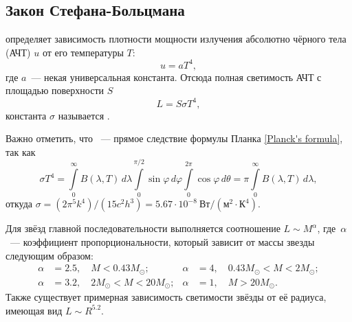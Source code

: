 \subsection{Закон Стефана-Больцмана}
 определяет зависимость плотности мощности излучения абсолютно чёрного тела (АЧТ) $u$ от его температуры $T$:
\begin{equation}
u = a T^4,
\end{equation} 
где $a$~--- некая универсальная константа.
Отсюда полная светимость АЧТ с площадью поверхности $S$
	\begin{equation}
	L = S \sigma T^4,
	\label{eq:steff-bol-law}
\end{equation}
константа $\sigma$ называется .
  
Важно отметить, что ~--- прямое следствие формулы Планка \eqref{Planck's formula}, так как
\begin{equation}
	\sigma T^4 = \int\limits^\infty_0 B(\lambda, T)\,d\lambda \int\limits_0^{\pi/2} \sin \varphi\, d\varphi \int\limits_0^{2\pi} \cos \varphi\, d\theta = \pi \int\limits^\infty_0 B(\lambda, T)\,d\lambda,
\end{equation}
откуда $\sigma = (2\pi^5k^4)/(15c^2h^3) = 5.67 \cdot 10^{-8}~\text{Вт}/(\text{м}^2\cdot \text{К}^4)$.

Для звёзд главной последовательности выполняется соотношение $L \sim M^{\alpha}$, где~$\alpha$~--- коэффициент пропорциональности, который зависит от массы звезды следующим образом:
\begin{align*}
\alpha &= 2.5, \quad M < 0.43 M_\odot; & 
\alpha &= 4, \quad 0.43 M_\odot < M < 2 M_\odot;\\ 
\alpha &= 3.2, \quad 2 M_\odot < M < 20 M_\odot; & 
\alpha &= 1, \quad M > 20 M_\odot.
\end{align*}
Также существует примерная зависимость светимости звёзды от её радиуса, имеющая вид  $L\sim R^{5.2}$.